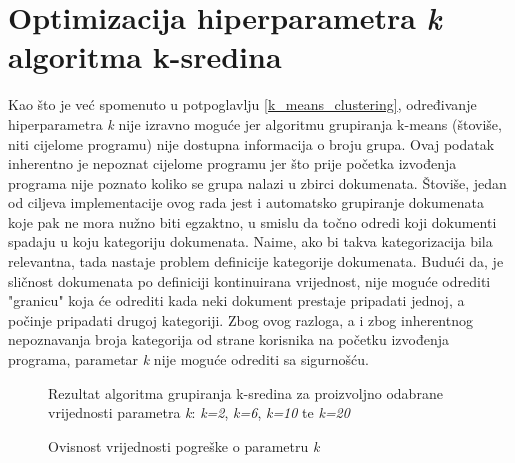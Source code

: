 \documentclass[times, utf8, zavrsni]{fer}
\begin{document}
\section{Optimizacija hiperparametra \textit{k} algoritma k-sredina}
\label{kmeans_optimization}
Kao što je već spomenuto u potpoglavlju \ref{k_means_clustering}, određivanje hiperparametra \textit{k} nije izravno moguće jer algoritmu grupiranja k-means (štoviše, niti cijelome programu) nije dostupna informacija o broju grupa. Ovaj podatak inherentno je nepoznat cijelome programu jer što prije početka izvođenja programa nije poznato koliko se grupa nalazi u zbirci dokumenata. Štoviše, jedan od ciljeva implementacije ovog rada jest i automatsko grupiranje dokumenata koje pak ne mora nužno biti egzaktno, u smislu da točno odredi koji dokumenti spadaju u koju kategoriju dokumenata. Naime, ako bi takva kategorizacija bila relevantna, tada nastaje problem definicije kategorije dokumenata. Budući da, je sličnost dokumenata po definiciji kontinuirana vrijednost, nije moguće odrediti "granicu" koja će odrediti kada neki dokument prestaje pripadati jednoj, a počinje pripadati drugoj kategoriji. Zbog ovog razloga, a i zbog inherentnog nepoznavanja broja kategorija od strane korisnika na početku izvođenja programa, parametar \textit{k} nije moguće odrediti sa sigurnošću.
\begin{figure}
\caption{Rezultat algoritma grupiranja k-sredina za proizvoljno odabrane vrijednosti parametra \textit{k}: \textit{k=2}, \textit{k=6}, \textit{k=10} te \textit{k=20}}
\label{img:graph_kmeans}
\end{figure}
\begin{figure}[h]
\centering    
\def\svgwidth{\columnwidth}

\caption{Ovisnost vrijednosti pogreške o parametru \textit{k}}
\label{img:elbow}
\end{figure}
\end{document}
